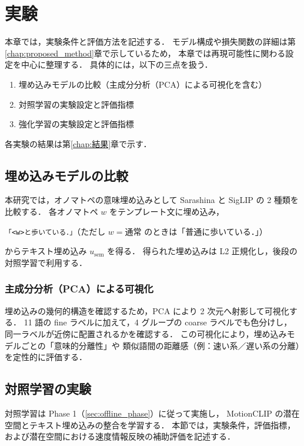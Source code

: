 \chapter{実験}
\label{chap:実験}

本章では，実験条件と評価方法を記述する．
モデル構成や損失関数の詳細は第\ref{chap:proposed_method}章で示しているため，
本章では再現可能性に関わる設定を中心に整理する．
具体的には，以下の三点を扱う．
\begin{enumerate}
  \item[(i)] 埋め込みモデルの比較（主成分分析（PCA）による可視化を含む）
  \item[(ii)] 対照学習の実験設定と評価指標
  \item[(iii)] 強化学習の実験設定と評価指標
\end{enumerate}
各実験の結果は第\ref{chap:結果}章で示す．

\section{埋め込みモデルの比較}
\label{sec:embedding_experiment}

本研究では，オノマトペの意味埋め込みとして Sarashina \cite{sarashina} と
SigLIP \cite{siglip} の 2 種類を比較する．
各オノマトペ $w$ をテンプレート文に埋め込み，
\begin{center}
  \texttt{「<w>と歩いている．」}（ただし $w=\text{通常}$ のときは「普通に歩いている．」）
\end{center}
からテキスト埋め込み $u_{\mathrm{sem}}$ を得る．
得られた埋め込みは L2 正規化し，後段の対照学習で利用する．

\subsection{主成分分析（PCA）による可視化}
\label{subsec:embedding_pca}

埋め込みの幾何的構造を確認するため，PCA により 2 次元へ射影して可視化する．
11 語の fine ラベルに加えて，4 グループの coarse ラベルでも色分けし，
同一ラベルが近傍に配置されるかを確認する．
この可視化により，埋め込みモデルごとの「意味的分離性」や
類似語間の距離感（例：速い系／遅い系の分離）を定性的に評価する．

\section{対照学習の実験}
\label{sec:contrastive_experiment}

対照学習は Phase 1（\ref{sec:offline_phase}）に従って実施し，
MotionCLIP \cite{MotionCLIP} の潜在空間とテキスト埋め込みの整合を学習する．
本節では，実験条件，評価指標，および潜在空間における速度情報反映の補助評価を記述する．

